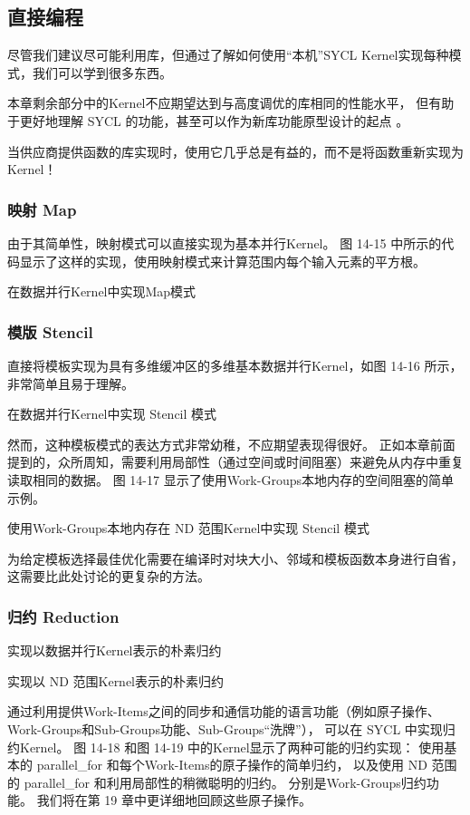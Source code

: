 \subsection{直接编程}
尽管我们建议尽可能利用库，但通过了解如何使用“本机”SYCL Kernel实现每种模式，我们可以学到很多东西。

本章剩余部分中的Kernel不应期望达到与高度调优的库相同的性能水平，
但有助于更好地理解 SYCL 的功能，甚至可以作为新库功能原型设计的起点 。

\begin{remark}[使用供应商提供的库！]
当供应商提供函数的库实现时，使用它几乎总是有益的，而不是将函数重新实现为Kernel！
\end{remark}

\subsubsection{映射 Map}
由于其简单性，映射模式可以直接实现为基本并行Kernel。 
图 14-15 中所示的代码显示了这样的实现，使用映射模式来计算范围内每个输入元素的平方根。

{\color{red} 在数据并行Kernel中实现Map模式}

\subsubsection{模版 Stencil}
直接将模板实现为具有多维缓冲区的多维基本数据并行Kernel，如图 14-16 所示，非常简单且易于理解。

{\color{red} 在数据并行Kernel中实现 Stencil 模式}

然而，这种模板模式的表达方式非常幼稚，不应期望表现得很好。 
正如本章前面提到的，众所周知，需要利用局部性（通过空间或时间阻塞）来避免从内存中重复读取相同的数据。 
图 14-17 显示了使用Work-Groups本地内存的空间阻塞的简单示例。

{\color{red} 使用Work-Groups本地内存在 ND 范围Kernel中实现 Stencil 模式}

为给定模板选择最佳优化需要在编译时对块大小、邻域和模板函数本身进行自省，这需要比此处讨论的更复杂的方法。

\subsubsection{归约 Reduction}
{\color{red} 实现以数据并行Kernel表示的朴素归约}

{\color{red} 实现以 ND 范围Kernel表示的朴素归约}

通过利用提供Work-Items之间的同步和通信功能的语言功能（例如原子操作、Work-Groups和Sub-Groups功能、Sub-Groups“洗牌”），
可以在 SYCL 中实现归约Kernel。 
图 14-18 和图 14-19 中的Kernel显示了两种可能的归约实现：
使用基本的 parallel\_for 和每个Work-Items的原子操作的简单归约，
以及使用 ND 范围的 parallel\_for 和利用局部性的稍微聪明的归约。 
分别是Work-Groups归约功能。 我们将在第 19 章中更详细地回顾这些原子操作。


